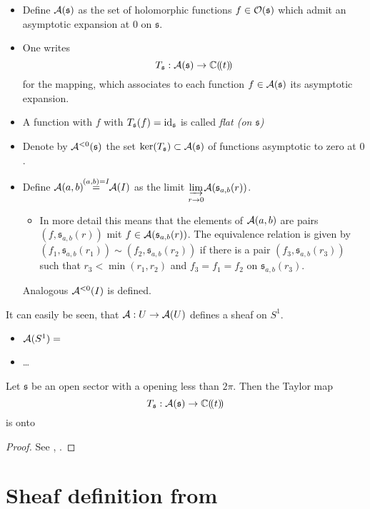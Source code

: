 \begin{notations}
  \begin{itemize}
    \item Define $\mathcal{A}(\mathfrak{s})$ as the set of holomorphic functions
      $f\in\mathcal{O}(\mathfrak{s})$ which admit an asymptotic expansion at $0$ on
      $\mathfrak{s}$.
    \item One writes
      \[
        T_{\mathfrak{s}}:\mathcal{A}(\mathfrak{s})\to\mathbb{C}(\!(t)\!)
      \]
      for the mapping, which associates to each function
      $f\in\mathcal{A}(\mathfrak{s})$ its asymptotic expansion.
    \item A function with $f$ with $T_{\mathfrak{s}}(f)=\operatorname{id}_{\mathfrak{s}}$ is
      called \emph{flat (on $\mathfrak{s}$)}
    \item Denote by $\mathcal{A}^{<0}(\mathfrak{s})$ the set
      $\ker(T_{\mathfrak{s}})\subset\mathcal{A}(\mathfrak{s})$ of functions asymptotic
      to zero at $0$.
    \item Define $\mathcal{A}(a,b)\!\!\overset{(a,b)=I}{=}\!\!\mathcal{A}(I)$
      as the limit
      $\underset{r\to0}{\underrightarrow{\lim}}\mathcal{A}(\mathfrak{s}_{a,b}(r))$.
      \begin{itemize}
        \item[] In more detail this means that the elements of $\mathcal{A}(a,b)$
          are pairs $(f,\mathfrak{s}_{a,b}(r))$ mit
          $f\in\mathcal{A}(\mathfrak{s}_{a,b}(r))$. The equivalence relation is given
          by $(f_1,\mathfrak{s}_{a,b}(r_1))\sim(f_2,\mathfrak{s}_{a,b}(r_2))$
          if there is a pair $(f_3,\mathfrak{s}_{a,b}(r_3))$ such that
          $r_3<\min(r_1,r_2)$ and $f_3=f_1=f_2$ on $\mathfrak{s}_{a,b}(r_3)$.
      \end{itemize}
      Analogous $\mathcal{A}^{<0}(I)$ is defined.
  \end{itemize}
\end{notations}
It can easily be seen, that $\mathcal{A}:U\to\mathcal{A}(U)$ defines a sheaf on $S^1$.
\begin{itemize}
  \item $\mathcal{A}(S^1)=$\TODO
  \item\dots
\end{itemize}

\begin{thm}
  Let $\mathfrak{s}$ be an open sector with a opening less than $2\pi$.
  Then the Taylor map
  \[
    T_{\mathfrak{s}}:\mathcal{A}(\mathfrak{s})\to\mathbb{C}(\!(t)\!)
  \]
  is onto
\end{thm}
\begin{proof}
  See \cite[theoreme 7.3]{van2003galois}, \cite{sabbah_cimpa90}.
\end{proof}

\section{Sheaf definition from \cite{sabbah2007isomonodromic}}

